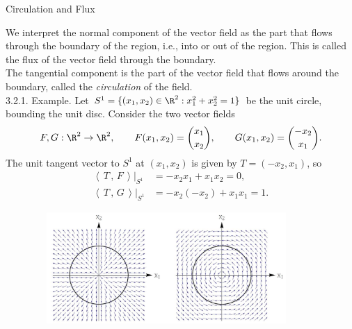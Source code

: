 \documentclass[smaller,hyperref={CJKbookmarks=true}]{beamer}
\newcommand{\scp}[2]{\left\langle\,#1\,,\,#2\,\right\rangle} \newcommand{\scpp}{\langle\,\cdot\,,\,\cdot\,\rangle}
\begin{document}
\begin{frame}{Circulation and Flux}
\begin{spacing}{1.05}
We interpret the normal component of the vector field as the part that
flows through the boundary of the region, i.e., into or out of the region.
This is called the flux of the vector field through the boundary.\\[5pt]
The tangential component is the part of the vector field that flows around
the boundary, called the \emph{circulation} of the field.\\[4pt]
\alert{3.2.1. Example.} Let $S^1=\{(x_1,x_2)\in\R^2:x_1^2+x_2^2=1\}$ be the unit circle, bounding the unit disc. Consider the two vector fields
\[F,G:\R^2\to\R^2,\qquad F(x_1,x_2)=\binom{x_1}{x_2},\qquad
G(x_1,x_2)=\binom{-x_2}{x_1}.\]
The unit tangent vector to $S^1$ at $(x_1,x_2)$ is given by $T=(-x_2,x_1)$, so
\begin{align*}
  \scp{T}{F}\big|_{S^1} &=-x_2x_1+x_1x_2=0, \\
  \scp{T}{G}\big|_{S^1} &=-x_2(-x_2)+x_1x_1=1.
\end{align*}
\newpage
\begin{figure}
  \centering
  \includegraphics[width=0.9\textwidth,height=120pt]{68.jpg}


\end{figure}
\end{spacing}
\end{frame}
\end{document}
